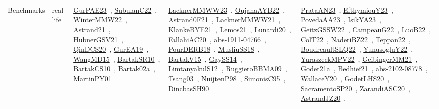 {\begin{longtable}{lp{3cm}>{\raggedright\arraybackslash}p{6cm}>{\raggedright\arraybackslash}p{6cm}>{\raggedright\arraybackslash}p{8cm}}
Benchmarks & real-life & \href{works/GurPAE23.pdf}{GurPAE23}~\cite{GurPAE23}, \href{works/SubulanC22.pdf}{SubulanC22}~\cite{SubulanC22}, \href{works/WinterMMW22.pdf}{WinterMMW22}~\cite{WinterMMW22}, \href{works/Astrand21.pdf}{Astrand21}~\cite{Astrand21}, \href{works/HubnerGSV21.pdf}{HubnerGSV21}~\cite{HubnerGSV21}, \href{works/QinDCS20.pdf}{QinDCS20}~\cite{QinDCS20}, \href{works/GurEA19.pdf}{GurEA19}~\cite{GurEA19}, \href{works/WangMD15.pdf}{WangMD15}~\cite{WangMD15}, \href{works/BartakSR10.pdf}{BartakSR10}~\cite{BartakSR10}, \href{works/BartakCS10.pdf}{BartakCS10}~\cite{BartakCS10}, \href{works/Bartak02a.pdf}{Bartak02a}~\cite{Bartak02a}, \href{works/MartinPY01.pdf}{MartinPY01}~\cite{MartinPY01} & \href{works/LacknerMMWW23.pdf}{LacknerMMWW23}~\cite{LacknerMMWW23}, \href{works/OujanaAYB22.pdf}{OujanaAYB22}~\cite{OujanaAYB22}, \href{works/Astrand0F21.pdf}{Astrand0F21}~\cite{Astrand0F21}, \href{works/LacknerMMWW21.pdf}{LacknerMMWW21}~\cite{LacknerMMWW21}, \href{works/KlankeBYE21.pdf}{KlankeBYE21}~\cite{KlankeBYE21}, \href{works/Lemos21.pdf}{Lemos21}~\cite{Lemos21}, \href{works/Lunardi20.pdf}{Lunardi20}~\cite{Lunardi20}, \href{works/FallahiAC20.pdf}{FallahiAC20}~\cite{FallahiAC20}, \href{works/abs-1911-04766.pdf}{abs-1911-04766}~\cite{abs-1911-04766}, \href{works/PourDERB18.pdf}{PourDERB18}~\cite{PourDERB18}, \href{works/MusliuSS18.pdf}{MusliuSS18}~\cite{MusliuSS18}, \href{works/BartakV15.pdf}{BartakV15}~\cite{BartakV15}, \href{works/GaySS14.pdf}{GaySS14}~\cite{GaySS14}, \href{works/LimtanyakulS12.pdf}{LimtanyakulS12}~\cite{LimtanyakulS12}, \href{works/RuggieroBBMA09.pdf}{RuggieroBBMA09}~\cite{RuggieroBBMA09}, \href{works/Tsang03.pdf}{Tsang03}~\cite{Tsang03}, \href{works/NuijtenP98.pdf}{NuijtenP98}~\cite{NuijtenP98}, \href{works/SimonisC95.pdf}{SimonisC95}~\cite{SimonisC95}, \href{works/DincbasSH90.pdf}{DincbasSH90}~\cite{DincbasSH90} & \href{works/PrataAN23.pdf}{PrataAN23}~\cite{PrataAN23}, \href{works/EfthymiouY23.pdf}{EfthymiouY23}~\cite{EfthymiouY23}, \href{works/PovedaAA23.pdf}{PovedaAA23}~\cite{PovedaAA23}, \href{works/IsikYA23.pdf}{IsikYA23}~\cite{IsikYA23}, \href{works/GeitzGSSW22.pdf}{GeitzGSSW22}~\cite{GeitzGSSW22}, \href{works/CampeauG22.pdf}{CampeauG22}~\cite{CampeauG22}, \href{works/LuoB22.pdf}{LuoB22}~\cite{LuoB22}, \href{works/ColT22.pdf}{ColT22}~\cite{ColT22}, \href{works/NaderiBZ22.pdf}{NaderiBZ22}~\cite{NaderiBZ22}, \href{works/Teppan22.pdf}{Teppan22}~\cite{Teppan22}, \href{works/BoudreaultSLQ22.pdf}{BoudreaultSLQ22}~\cite{BoudreaultSLQ22}, \href{works/YunusogluY22.pdf}{YunusogluY22}~\cite{YunusogluY22}, \href{works/YuraszeckMPV22.pdf}{YuraszeckMPV22}~\cite{YuraszeckMPV22}, \href{works/GeibingerMM21.pdf}{GeibingerMM21}~\cite{GeibingerMM21}, \href{works/Godet21a.pdf}{Godet21a}~\cite{Godet21a}, \href{works/Bedhief21.pdf}{Bedhief21}~\cite{Bedhief21}, \href{works/abs-2102-08778.pdf}{abs-2102-08778}~\cite{abs-2102-08778}, \href{works/WallaceY20.pdf}{WallaceY20}~\cite{WallaceY20}, \href{works/GodetLHS20.pdf}{GodetLHS20}~\cite{GodetLHS20}, \href{works/SacramentoSP20.pdf}{SacramentoSP20}~\cite{SacramentoSP20}, \href{works/ZarandiASC20.pdf}{ZarandiASC20}~\cite{ZarandiASC20}, \href{works/AstrandJZ20.pdf}{AstrandJZ20}~\cite{AstrandJZ20}, 
\end{longtable}}
